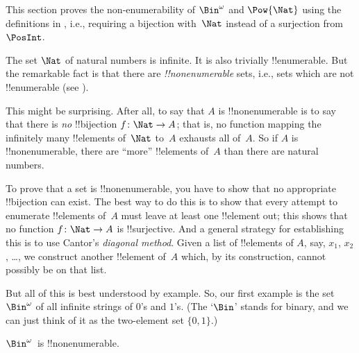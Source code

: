 \documentclass[../../../include/open-logic-section]{subfiles}
\begin{document}

\begin{editorial}
  This section proves the non-enumerability of $\Bin^\omega$ and
  $\Pow{\Nat}$ using the definitions in , i.e.,
  requiring a bijection with~$\Nat$ instead of a surjection from
  $\PosInt$.
\end{editorial}

\begin{explain}
The set $\Nat$ of natural numbers is infinite. It is also trivially
!!{enumerable}. But the remarkable fact is that there are
\emph{!!{nonenumerable}} sets, i.e., sets which are not !!{enumerable}
(see ).

This might be surprising. After all, to say that $A$ is
!!{nonenumerable} is to say that there is \emph{no} !!{bijection} $f
\colon \Nat \to A$; that is, no function mapping the infinitely many
!!{element}s of~$\Nat$ to~$A$ exhausts all of~$A$.  So if $A$ is
!!{nonenumerable}, there are ``more'' !!{element}s of~$A$ than there
are natural numbers.

To prove that a set is !!{nonenumerable}, you have to show that no
appropriate !!{bijection} can exist. The best way to do this is to
show that every attempt to enumerate !!{element}s of~$A$ must leave at
least one !!{element} out; this shows that no function $f\colon \Nat
\to A$ is !!{surjective}. And a general strategy for establishing this
is to use Cantor's \emph{diagonal method}. Given a list of
!!{element}s of $A$, say, $x_1$, $x_2$, \dots, we construct another
!!{element} of~$A$ which, by its construction, cannot possibly be on
that list.

But all of this is best understood by example. So, our first example
is the set~$\Bin^\omega$ of all infinite strings of $0$'s and $1$'s.
(The `$\Bin$' stands for binary, and we can just think of it as the
two-element set
$\{0,1\}$.)
\end{explain}

\begin{thm}
$\Bin^\omega$~is !!{nonenumerable}.
\end{thm}
\end{document}
